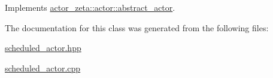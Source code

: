 Implements \hyperlink{classactor__zeta_1_1actor_1_1abstract__actor_a929d99bea25095035695bad6e6516575}{actor\+\_\+zeta\+::actor\+::abstract\+\_\+actor}.



The documentation for this class was generated from the following files\+:\begin{DoxyCompactItemize}
\item 
\hyperlink{scheduled__actor_8hpp}{scheduled\+\_\+actor.\+hpp}\item 
\hyperlink{scheduled__actor_8cpp}{scheduled\+\_\+actor.\+cpp}\end{DoxyCompactItemize}
